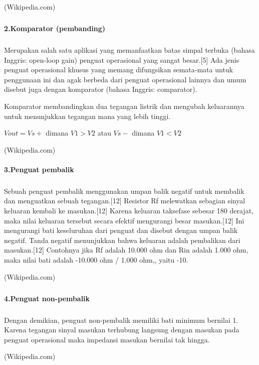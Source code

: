 \documentclass[12pt,a4paper]{article}
\begin{document}
\begin{flushright}
(Wikipedia.com)
\end{flushright}

\subparagraph{ }
\textbf{2.Komparator (pembanding)}
\subparagraph{ }
 Merupakan salah satu aplikasi yang memanfaatkan batas simpal terbuka (bahasa Inggris: open-loop gain) penguat operasional yang sangat besar.[5] Ada jenis penguat operasional khusus yang memang difungsikan semata-mata untuk penggunaan ini dan agak berbeda dari penguat operasional lainnya dan umum disebut juga dengan komparator (bahasa Inggris: comparator).

Komparator membandingkan dua tegangan listrik dan mengubah keluarannya untuk menunjukkan tegangan mana yang lebih tinggi.

$Vout = Vs+$   dimana   $V1>V2$   atau   $Vs-$   dimana   $V1<V2 $

\begin{flushright}
(Wikipedia.com) 
\end{flushright}

\paragraph{ }
\textbf{3.Penguat pembalik}
\subparagraph{ }
	Sebuah penguat pembalik menggunakan umpan balik negatif untuk membalik dan menguatkan sebuah tegangan.[12] Resistor Rf melewatkan sebagian sinyal keluaran kembali ke masukan.[12] Karena keluaran taksefase sebesar 180 derajat, maka nilai keluaran tersebut secara efektif mengurangi besar masukan.[12] Ini mengurangi bati keseluruhan dari penguat dan disebut dengan umpan balik negatif. Tanda negatif menunjukkan bahwa keluaran adalah pembalikan dari masukan.[12] Contohnya jika Rf adalah 10.000 ohm dan Rin adalah 1.000 ohm, maka nilai bati adalah -10.000 ohm / 1.000 ohm,, yaitu -10.
	
\begin{flushright}
(Wikipedia.com) 
\end{flushright}
	
\subparagraph{ }
\textbf{4.Penguat non-pembalik}
\subparagraph{ }
	Dengan demikian, penguat non-pembalik memiliki bati minimum bernilai 1. Karena tegangan sinyal masukan terhubung langsung dengan masukan pada penguat operasional maka impedansi masukan bernilai tak hingga.
	
\begin{flushright}
(Wikipedia.com) 
\end{flushright}
\end{document}
